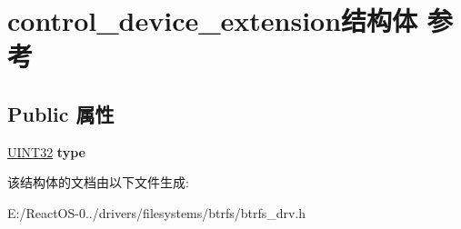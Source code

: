 \hypertarget{structcontrol__device__extension}{}\section{control\+\_\+device\+\_\+extension结构体 参考}
\label{structcontrol__device__extension}
\subsection*{Public 属性}
\begin{DoxyCompactItemize}
\item 
\mbox{\label{structcontrol__device__extension_a247f58708b4e89078ba8347be0623e7f}} 
\hyperlink{_processor_bind_8h_ae1e6edbbc26d6fbc71a90190d0266018}{U\+I\+N\+T32} {\bfseries type}
\end{DoxyCompactItemize}


该结构体的文档由以下文件生成\+:\begin{DoxyCompactItemize}
\item 
E\+:/\+React\+O\+S-\/0../drivers/filesystems/btrfs/btrfs\+\_\+drv.\+h\end{DoxyCompactItemize}

